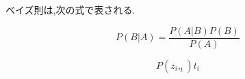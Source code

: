 \documentclass[12pt]{jsarticle}
\begin{document}
ベイズ則は,次の式で表される.

\begin{equation}
  P(B|A) = \frac{P(A|B)P(B)}{P(A)}
\end{equation}

\begin{equation}
 P(z_i,_t){t_i}
\end{equation}
\end{document}
